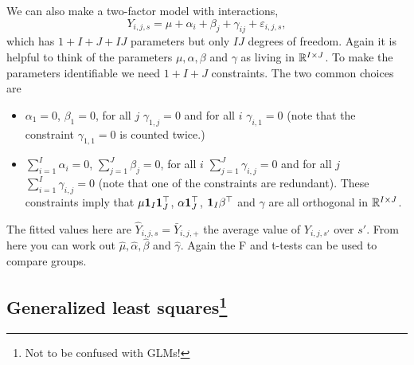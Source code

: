 We can also make a two-factor model with interactions,
\begin{equation}
    \label{ANOVA3} Y_{i,j,s} = \mu + \alpha_i + \beta_j + \gamma_{ij} + \varepsilon_{i,j,s},
\end{equation}
which has $1+I+J+IJ$ parameters but only $IJ$ degrees of freedom. Again it is helpful to think of the parameters $\mu,\alpha,\beta$ and $\gamma$ as living in $\mathbb{R}^{I\times J}$. To make the parameters identifiable we need $1+I+J$ constraints. The two common choices are
\begin{itemize}
    \item $\alpha_1 = 0$, $\beta_1=0$, for all $j$ $\gamma_{1,j}=0$ and for all $i$ $\gamma_{i,1}=0$ (note that the constraint $\gamma_{1,1}=0$ is counted twice.)
    \item $\sum_{i=1}^I \alpha_i = 0$, $\sum_{j=1}^J \beta_j = 0$, for all $i$ $\sum_{j=1}^J\gamma_{i,j}=0$ and for all $j$ $\sum_{i=1}^I \gamma_{i,j} = 0$ (note that one of the constraints are redundant). These constraints imply that $\mu \mathbf 1_I \mathbf 1_J^\top $, $\alpha \mathbf 1_J^\top$, $\mathbf 1_I \beta^\top$ and $\gamma$ are all orthogonal in $\mathbb{R}^{I \times J}$.
\end{itemize}
The fitted values here are $\hat{Y}_{i,j,s} = \bar{Y}_{i,j,+}$ the average value of $Y_{i,j,s'}$ over $s'$. From here you can work out $\hat{\mu},\hat{\alpha},\hat{\beta}$ and $\hat{\gamma}$. Again the F and t-tests can be used to compare groups. 


\subsection{Generalized least squares\footnote{Not to be confused with GLMs!}}

